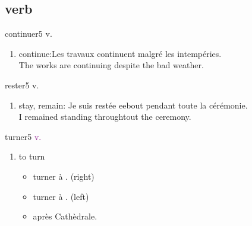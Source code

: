 \documentclass[./templates/main.tex]{subfiles}
\begin{document}
\begin{french}

	\section{verb}
	\begin{word}{continuer}{}{5}\label{wo:continuer}
		v.
		\begin{enumerate}[label=(\arabic*)]
			\item continue:Les travaux continuent malgré les intempéries. \\
			      The works are continuing despite the bad weather.
		\end{enumerate}
	\end{word}
	\begin{word}{rester}{}{5}\label{wo:rester}
		v.
		\begin{enumerate}[label=(\arabic*)]
			\item stay, remain: Je suis restée eebout pendant toute la cérémonie. \\
			      I remained standing throughtout the ceremony.
		\end{enumerate}
	\end{word}
	\begin{word}{turner}{}{5}\label{wo:turner}
		\textcolor{purple}{v.} \begin{enumerate}[label=(\arabic*)]
			\item to turn
			      \begin{itemize}
				      \item turner à . (right)
				      \item turner à . (left)
				      \item après  Cathèdrale.
			      \end{itemize}

		\end{enumerate}
	\end{word}

\end{french}
\end{document}
